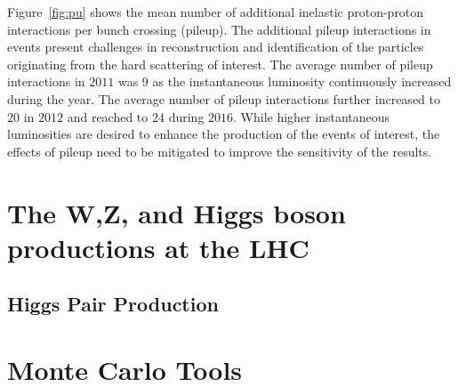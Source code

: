 Figure~\ref{fig:pu} shows the mean number of additional inelastic proton-proton interactions per bunch crossing (pileup). The additional pileup interactions in events present challenges in reconstruction and identification of the particles originating from the hard scattering of interest. The average number of pileup interactions in $2011$ was $9$ as the instantaneous luminosity continuously increased during the year. The average number of pileup interactions further increased to $20$ in $2012$ and reached to $24$ during $2016$.  While higher instantaneous luminosities are desired to enhance the production of the events of interest, the effects of pileup need to be mitigated to improve the sensitivity of the results. 

\section{The W,Z, and Higgs boson productions at the LHC}

\subsection{Higgs Pair Production}

\section{Monte Carlo Tools}




